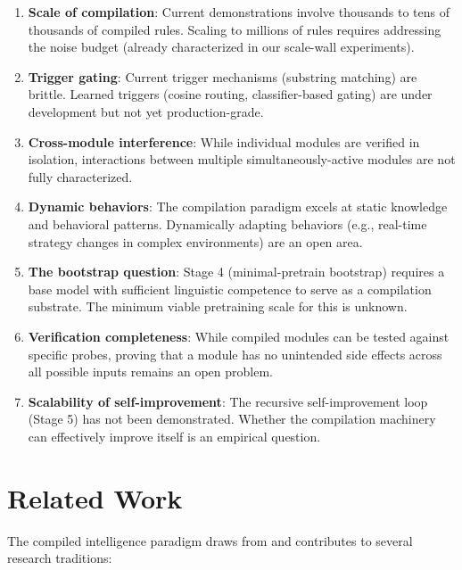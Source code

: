 \documentclass[11pt,a4paper]{article}
\begin{document}
\begin{enumerate}[leftmargin=*]
\item \textbf{Scale of compilation}: Current demonstrations involve thousands to tens of thousands of compiled rules. Scaling to millions of rules requires addressing the noise budget (already characterized in our scale-wall experiments).
\item \textbf{Trigger gating}: Current trigger mechanisms (substring matching) are brittle. Learned triggers (cosine routing, classifier-based gating) are under development but not yet production-grade.
\item \textbf{Cross-module interference}: While individual modules are verified in isolation, interactions between multiple simultaneously-active modules are not fully characterized.
\item \textbf{Dynamic behaviors}: The compilation paradigm excels at static knowledge and behavioral patterns. Dynamically adapting behaviors (e.g., real-time strategy changes in complex environments) are an open area.
\item \textbf{The bootstrap question}: Stage 4 (minimal-pretrain bootstrap) requires a base model with sufficient linguistic competence to serve as a compilation substrate. The minimum viable pretraining scale for this is unknown.
\item \textbf{Verification completeness}: While compiled modules can be tested against specific probes, proving that a module has no unintended side effects across all possible inputs remains an open problem.
\item \textbf{Scalability of self-improvement}: The recursive self-improvement loop (Stage 5) has not been demonstrated. Whether the compilation machinery can effectively improve itself is an empirical question.
\end{enumerate}

\section{Related Work}

The compiled intelligence paradigm draws from and contributes to several research traditions:
\end{document}
